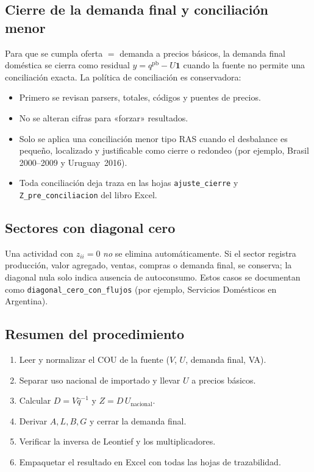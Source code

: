 \documentclass[11pt,a4paper]{article}
\begin{document}
\subsection{Cierre de la demanda final y conciliación menor}
Para que se cumpla oferta $=$ demanda a precios básicos, la demanda final
doméstica se cierra como residual $y = q^{\text{pb}} - U\mathbf{1}$ cuando la
fuente no permite una conciliación exacta. La política de conciliación es
conservadora:
\begin{itemize}[leftmargin=1.6em,nosep]
  \item Primero se revisan parsers, totales, códigos y puentes de precios.
  \item No se alteran cifras para «forzar» resultados.
  \item Solo se aplica una conciliación menor tipo RAS cuando el desbalance es
        pequeño, localizado y justificable como cierre o redondeo (por ejemplo,
        Brasil 2000--2009 y Uruguay~2016).
  \item Toda conciliación deja traza en las hojas \texttt{ajuste\_cierre} y
        \texttt{Z\_pre\_conciliacion} del libro Excel.
\end{itemize}

\subsection{Sectores con diagonal cero}
Una actividad con $z_{ii}=0$ \emph{no} se elimina automáticamente. Si el sector
registra producción, valor agregado, ventas, compras o demanda final, se
conserva; la diagonal nula solo indica ausencia de autoconsumo. Estos casos se
documentan como \texttt{diagonal\_cero\_con\_flujos} (por ejemplo, Servicios
Domésticos en Argentina).

\subsection{Resumen del procedimiento}
\begin{enumerate}[leftmargin=1.6em,nosep]
  \item Leer y normalizar el COU de la fuente ($V$, $U$, demanda final, VA).
  \item Separar uso nacional de importado y llevar $U$ a precios básicos.
  \item Calcular $D=V\hat{q}^{-1}$ y $Z=D\,U_{\text{nacional}}$.
  \item Derivar $A,L,B,G$ y cerrar la demanda final.
  \item Verificar la inversa de Leontief y los multiplicadores.
  \item Empaquetar el resultado en Excel con todas las hojas de trazabilidad.
\end{enumerate}
\end{document}

